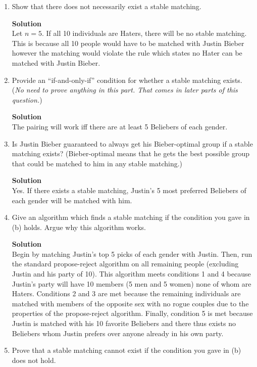 \documentclass[11pt]{article}
\newenvironment{Parts}{\begin{enumerate}[label=(\alph*)]}{\end{enumerate}}
\newcommand*{\Part}{\item}
\newenvironment{Answer}{\vspace{10pt}\begin{mdframed}\textbf{Solution}\\}{\end{mdframed}\vfill\pagebreak[3]}
\newenvironment{Answer}{\vspace{10pt}}{\vfill\pagebreak[3]}
\begin{document}
\begin{Parts}
\Part { Show that there does not necessarily exist a stable matching.}

\begin{Answer}
Let $n=5$. If all 10 individuals are Haters, there will be no stable matching. This is because all 10 people would have to be matched with Justin Bieber however the matching would violate the rule which states no Hater can be matched with Justin Bieber.
\end{Answer}

\Part { Provide an ``if-and-only-if'' condition for whether a
    stable matching exists. } ({\em No need to prove anything in this
  part. That comes in later parts of this question.})

\begin{Answer}
    The pairing will work iff there are at least 5 Beliebers of each gender.
\end{Answer}

\Part { Is Justin Bieber guaranteed to always get his
    Bieber-optimal group if a stable matching exists?} (Bieber-optimal
  means that he gets the best possible group that could be matched to
  him in any stable matching.)

\begin{Answer}
    Yes. If there exists a stable matching, Justin's 5 most preferred Beliebers of each gender will be matched with him.
\end{Answer}

\Part { Give an algorithm which finds a stable matching if the condition
  you gave in (b) holds. Argue why this algorithm works.}

\begin{Answer}
    Begin by matching Justin's top 5 picks of each gender with Justin. Then, run the standard propose-reject algorithm on all remaining people (excluding Justin and his party of 10). This algorithm meets conditions 1 and 4 because Justin's party will have 10 members (5 men and 5 women) none of whom are Haters. Conditions 2 and 3 are met because the remaining individuals are matched with members of the opposite sex with no rogue couples due to the properties of the propose-reject algorithm. Finally, condition 5 is met because Justin is matched with his 10 favorite Beliebers and there thus exists no Beliebers whom Justin prefers over anyone already in his own party.
\end{Answer}

\Part { Prove that a stable matching cannot exist if
    the condition you gave in (b) does not hold.}


\end{Parts}
\end{document}
